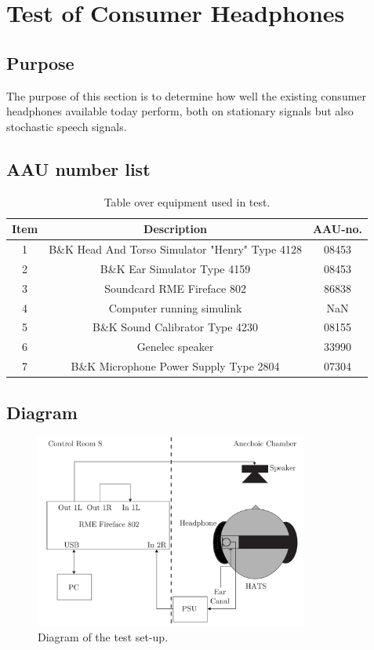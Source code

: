 
\section{Test of Consumer Headphones}

\subsection{Purpose}
The purpose of this section is to determine how well the existing consumer headphones available today perform, both on stationary signals but also stochastic speech signals.




\subsection{AAU number list}
\begin{table}[H]
	\centering
	\begin{tabular}{ c c c } \toprule
		{Item}	& {Description} 						& {AAU-no}. \\ \bottomrule 
		1	&	B\&K Head And Torso Simulator "Henry" Type 4128	& 08453	\\
		2	&	B\&K Ear Simulator Type 4159				& 08453		\\
		3	&	Soundcard RME Fireface 802					& 86838		\\
		4	&	Computer running simulink					& NaN		\\
		5	&	B\&K Sound Calibrator Type 4230				& 08155		\\ 
		6	&	Genelec speaker								& 33990		\\ 
		7	& 	B\&K Microphone Power Supply Type 2804		& 07304		\\
		\bottomrule
	\end{tabular}
	\caption{Table over equipment used in test.}
	\label{tab:UsedEquipmentListConsumerHP}
\end{table}



\subsection{Diagram}
\begin{figure}[H]
	\centering
	\includegraphics[width=0.8\textwidth]{../Journal/Experiments/TestofConsumerHeadphones/OtherBrandsDiagram.pdf}
	\caption{Diagram of the test set-up.}
	\label{OtherBrandsDiagram}
\end{figure}


